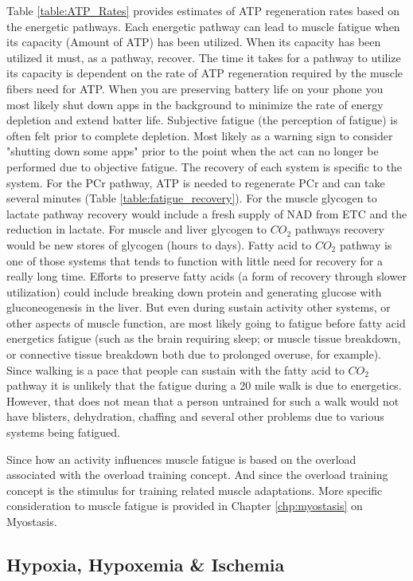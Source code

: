 Table \ref{table:ATP_Rates} provides estimates of ATP regeneration rates based on the energetic pathways. Each energetic pathway can lead to muscle fatigue when its capacity (Amount of ATP) has been utilized. When its capacity has been utilized it must, as a pathway, recover. The time it takes for a pathway to utilize its capacity is dependent on the rate of ATP regeneration required by the muscle fibers need for ATP. When you are preserving battery life on your phone you most likely shut down apps in the background to minimize the rate of energy depletion and extend batter life. Subjective fatigue (the perception of fatigue) is often felt prior to complete depletion. Most likely as a warning sign to consider "shutting down some apps" prior to the point when the act can no longer be performed due to objective fatigue. 
The recovery of each system is specific to the system. For the PCr pathway, ATP is needed to regenerate PCr and can take several minutes (Table \ref{table:fatigue_recovery}). For the muscle glycogen to lactate pathway recovery would include a fresh supply of NAD from ETC and the reduction in lactate. For muscle and liver glycogen to $CO_2$ pathways recovery would be new stores of glycogen (hours to days). Fatty acid to $CO_2$ pathway is one of those systems that tends to function with little need for recovery for a really long time. Efforts to preserve fatty acids (a form of recovery through slower utilization) could include breaking down protein and generating glucose with gluconeogenesis in the liver. But even during sustain activity other systems, or other aspects of muscle function, are most likely going to fatigue before fatty acid energetics fatigue (such as the brain requiring sleep; or muscle tissue breakdown, or connective tissue breakdown both due to prolonged overuse, for example). Since walking is a pace that people can sustain with the fatty acid to $CO_2$ pathway it is unlikely that the fatigue during a 20 mile walk is due to energetics. However, that does not mean that a person untrained for such a walk would not have blisters, dehydration, chaffing and several other problems due to various systems being fatigued.

Since how an activity influences muscle fatigue is based on the overload associated with the overload training concept. And since the overload training concept is the stimulus for training related muscle adaptations. More specific consideration to muscle fatigue is provided in Chapter \ref{chp:myostasis} on Myostasis.

\subsection{Hypoxia, Hypoxemia \& Ischemia}

